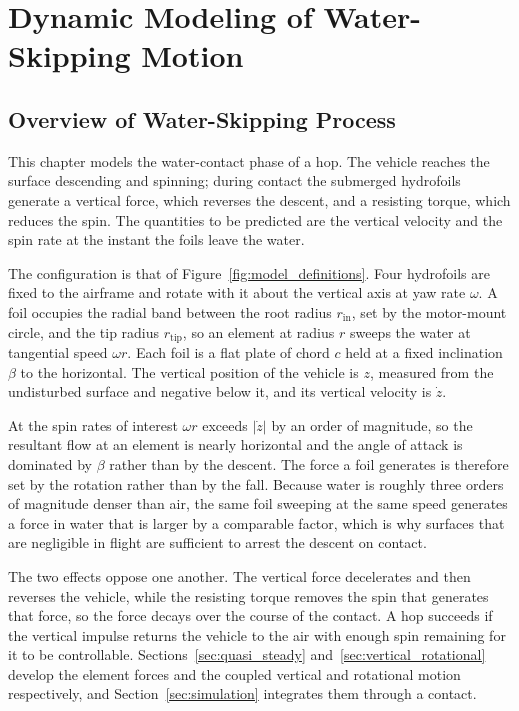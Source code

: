 \chapter{Dynamic Modeling of Water-Skipping Motion}

\label{dynamic}

\section{Overview of Water-Skipping Process}

This chapter models the water-contact phase of a hop.  The vehicle reaches the
surface descending and spinning; during contact the submerged hydrofoils
generate a vertical force, which reverses the descent, and a resisting torque,
which reduces the spin.  The quantities to be predicted are the vertical
velocity and the spin rate at the instant the foils leave the water.

The configuration is that of Figure~\ref{fig:model_definitions}.  Four
hydrofoils are fixed to the airframe and rotate with it about the vertical
axis at yaw rate $\omega$.  A foil occupies the radial band between the root
radius $r_{\mathrm{in}}$, set by the motor-mount circle, and the tip radius
$r_{\mathrm{tip}}$, so an element at radius $r$ sweeps the water at tangential
speed $\omega r$.  Each foil is a flat plate of chord $c$ held at a fixed
inclination $\beta$ to the horizontal.  The vertical position of the vehicle
is $z$, measured from the undisturbed surface and negative below it, and its
vertical velocity is $\dot{z}$.

At the spin rates of interest $\omega r$ exceeds $|\dot{z}|$ by an order of
magnitude, so the resultant flow at an element is nearly horizontal and the
angle of attack is dominated by $\beta$ rather than by the descent.  The force
a foil generates is therefore set by the rotation rather than by the fall.
Because water is roughly three orders of magnitude denser than air, the same
foil sweeping at the same speed generates a force in water that is larger by a
comparable factor, which is why surfaces that are negligible in flight are
sufficient to arrest the descent on contact.

The two effects oppose one another.  The vertical force decelerates and then
reverses the vehicle, while the resisting torque removes the spin that
generates that force, so the force decays over the course of the contact.  A
hop succeeds if the vertical impulse returns the vehicle to the air with enough
spin remaining for it to be controllable.  Sections~\ref{sec:quasi_steady}
and~\ref{sec:vertical_rotational} develop the element forces and the coupled
vertical and rotational motion respectively, and
Section~\ref{sec:simulation} integrates them through a contact.

